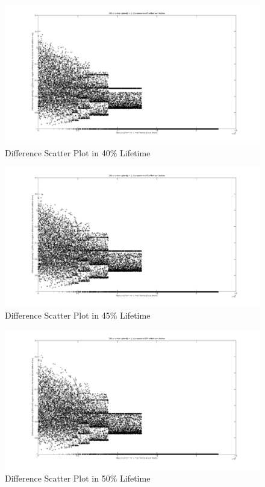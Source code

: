 \documentclass[12pt,a4paper]{report}
\begin{document}
	\vspace{-5cm}
	\begin{figure}
	\hspace{-3.7cm}\includegraphics[width=200mm]{eighth.jpg}
	\caption{Difference Scatter Plot in 40\% Lifetime}
	\end{figure}

	\vspace{-5cm}
	\begin{figure}
	\hspace{-3.7cm}\includegraphics[width=200mm]{nineth.jpg}
	\caption{Difference Scatter Plot in 45\% Lifetime}
	\end{figure}
	
	\vspace{-5cm}
	\begin{figure}
	\hspace{-3.7cm}\includegraphics[width=200mm]{tenth.jpg}
	\caption{Difference Scatter Plot in 50\% Lifetime}
	\end{figure}
\end{document}

